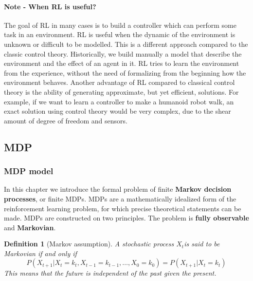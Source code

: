 \documentclass[main.tex]{subfiles}
\newtheorem{definition}{Definition}[section]
\begin{document}
\paragraph{Note - When RL is useful?} The goal of RL in many cases is to build a controller which can perform some task in an environment. RL is useful when the dynamic of the environment is unknown or difficult to be modelled. This is a different approach compared to the classic control theory. Historically, we build manually a model that describe the environment and the effect of an agent in it. RL tries to learn the environment from the experience, without the need of formalizing from the beginning how the environment behaves. Another advantage of RL compared to classical control theory is the ability of generating approximate, but yet efficient, solutions. For example, if we want to learn a controller to make a humanoid robot walk, an exact solution using control theory would be very complex, due to the shear amount of degree of freedom and sensors.

\subsection{MDP}
\subsubsection{MDP model}
In this chapter we introduce the formal problem of finite \textbf{Markov decision processes}, or finite MDPs. MDPs are a mathematically idealized form of the reinforcement learning problem, for which precise theoretical statements can be made. MDPs are constructed on two principles. The problem is \textbf{fully observable} and \textbf{Markovian}.
\begin{definition}[Markov assumption]
    A stochastic process $X_t$\footnotemark is said to be Markovian if and only if 
    \begin{equation*}
        P(X_{t+1}|X_t=k_t,X_{t-1}=k_{t-1}, \dots, X_0=k_0) = P(X_{t+1}|X_{t}=k_t)
    \end{equation*}
    This means that the future is independent of the past given the present.
\end{definition}
\end{document}
